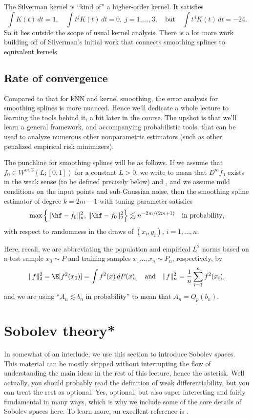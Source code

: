 \documentclass{article}
\begin{document}
The Silverman kernel is ``kind of'' a higher-order kernel. It satisfies 
\[
\int K(t) \, dt = 1, \quad
\int t^j K(t) \, dt = 0, \; j=1,\dots,3, 
\quad \text{but} \quad 
\int t^4 K(t) \, dt = -24.
\]
So it lies outside the scope of usual kernel analysis. There is a lot more work
building off of Silverman's initial work that connects smoothing splines to
equivalent kernels. 

\subsection{Rate of convergence} 

Compared to that for kNN and kernel smoothing, the error analysis for smoothing
splines is more nuanced. Hence we'll dedicate a whole lecture to learning the
tools behind it, a bit later in the course. The upshot is that we'll learn a
general framework, and accompanying probabilistic tools, that can be used 
to analyze numerous other nonparametric estimators (such as other penalized 
empirical risk minimizers).        

The punchline for smoothing splines will be as follows. If we assume that $f_0
\in W^{m,2}(L; [0,1])$ for a constant $L>0$, we write to mean that $D^m f_0$
exists in the weak sense (to be defined precisely below) and , and we assume mild conditions on the input 
points and sub-Gaussian noise, then the smoothing spline estimator of degree
$k=2m-1$ with tuning parameter  satisfies    
\[
\max \Big\{ \|\hf - f_0\|_n^2 , \, \|\hf - f_0\|_2^2 \Big\} \lesssim
n^{-2m/(2m+1)} \quad \text{in probability},
\]
with respect to randomness in the draws of $(x_i,y_i)$, $i=1,\dots,n$. 

Here, recall, we are abbreviating the population and empirical $L^2$ norms based
on a test sample $x_0 \sim P$ and training samples $x_1\dots,x_n \sim P_n$,
respectively, by  
\[
\|f\|_2^2 =  \E[f^2(x_0)] = \int f^2(x) \, dP(x), \quad \text{and} \quad
\|f\|_n^2 = \frac{1}{n} \sum_{i=1}^n f^2(x_i),
\]
and we are using ``$A_n \lesssim b_n$ in probability'' to mean that $A_n = 
O_p(b_n)$. 

\section{Sobolev theory*}

In somewhat of an interlude, we use this section to introduce Sobolev
spaces. This material can be mostly skipped without interrupting the flow of
understanding the main ideas in the rest of this lecture, hence the
asterisk. Well actually, you should probably read the definition of weak 
differentiability, but you can treat the rest as optional. Yes, optional, but
also super interesting and fairly fundamental in many ways, which is why we
include some of the core details of Sobolev spaces here. To learn more, an
excellent reference is \citet{evans2010partial}.  
\end{document}
